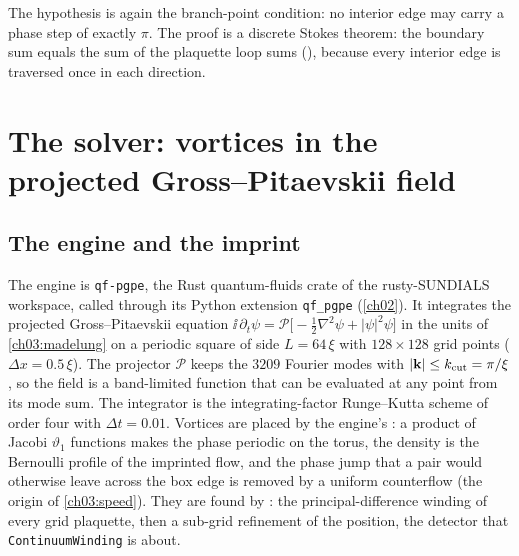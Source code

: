 The hypothesis  is again the branch-point condition: no interior edge may carry a phase step of exactly $\pi$. The proof is a discrete Stokes theorem: the boundary sum equals the sum of the plaquette loop sums (), because every interior edge is traversed once in each direction.

\section{The solver: vortices in the projected Gross--Pitaevskii field}\label{ch03:solver}

\subsection{The engine and the imprint}\label{ch03:engine}

The engine is \texttt{qf-pgpe}, the Rust quantum-fluids crate of the rusty-SUNDIALS workspace, called through its Python extension \texttt{qf\_pgpe} (\cref{ch02}). It integrates the projected Gross--Pitaevskii equation $\ii\,\partial_t\psi=\mathcal P\big[-\tfrac12\nabla^2\psi+|\psi|^2\psi\big]$ \cite{Davis2001,Blakie2008} in the units of \cref{ch03:madelung} on a periodic square of side $L=64\,\xi$ with $128\times128$ grid points ($\Delta x=0.5\,\xi$). The projector $\mathcal P$ keeps the $3209$ Fourier modes with $|\mathbf k|\le k_{\rm cut}=\pi/\xi$, so the field is a band-limited function that can be evaluated at any point from its mode sum. The integrator is the integrating-factor Runge--Kutta scheme of order four with $\Delta t=0.01$. Vortices are placed by the engine's : a product of Jacobi $\vartheta_1$ functions makes the phase periodic on the torus, the density is the Bernoulli profile of the imprinted flow, and the phase jump that a pair would otherwise leave across the box edge is removed by a uniform counterflow (the origin of \cref{ch03:speed}). They are found by : the principal-difference winding of every grid plaquette, then a sub-grid refinement of the position, the detector that \texttt{ContinuumWinding} is about.

